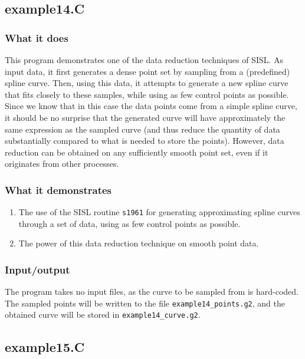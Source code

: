 \subsection{example14.C}

\subsubsection{What it does}
This program demonstrates one of the data reduction techniques of SISL.  As input data, it first
generates a dense point set by sampling from a (predefined) spline curve.  Then, using this
data, it attempts to generate a new spline curve that fits closely to these samples, while using 
as few control points as possible.  Since we know that in this case the data points come from
a simple spline curve, it should be no surprise that the generated curve will have approximately
the same expression as the sampled curve (and thus reduce the quantity of data substantially
compared to what is needed to store the points).  However, data reduction can be obtained on any
sufficiently smooth point set, even if it originates from other processes.

\subsubsection{What it demonstrates}
\begin{enumerate}
\item The use of the SISL routine \verb/s1961/ for generating approximating spline curves through
a set of data, using as few control points as possible.
\item The power of this data reduction technique on smooth point data.
\end{enumerate}
\subsubsection{Input/output}
The program takes no input files, as the curve to be sampled from is hard-coded.  \\
The sampled points will be written to the file \verb/example14_points.g2/, and the obtained
curve will be stored in \verb/example14_curve.g2/.

\subsection{example15.C}

